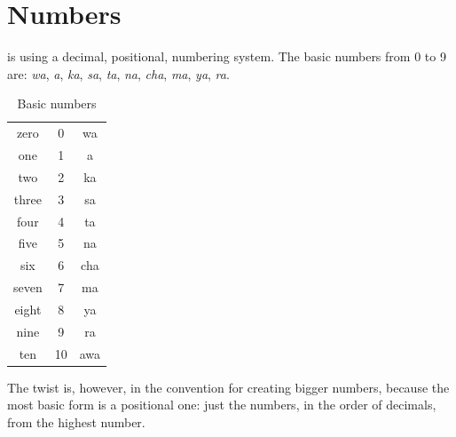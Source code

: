 


\section{Numbers}
\label{sec:morph-numbers}

\andro is using a decimal, positional, numbering system. The basic numbers from
0 to 9 are: \emph{wa}, \emph{a}, \emph{ka}, \emph{sa}, \emph{ta}, \emph{na},
\emph{cha}, \emph{ma}, \emph{ya}, \emph{ra}.

\begin{table}[ht]
    \centering
    \caption{Basic numbers}
    \begin{tabular}{ccc} \toprule
        zero  & 0  & wa  \\
        one   & 1  & a   \\
        two   & 2  & ka  \\
        three & 3  & sa  \\
        four  & 4  & ta  \\
        five  & 5  & na  \\
        six   & 6  & cha \\
        seven & 7  & ma  \\
        eight & 8  & ya  \\
        nine  & 9  & ra  \\
        ten   & 10 & awa \\\bottomrule
    \end{tabular}
    \label{tab:numerals}
\end{table}

The twist is, however, in the convention for creating bigger numbers, because
the most basic form is a positional one: just the numbers, in the order of
decimals, from the highest number.




